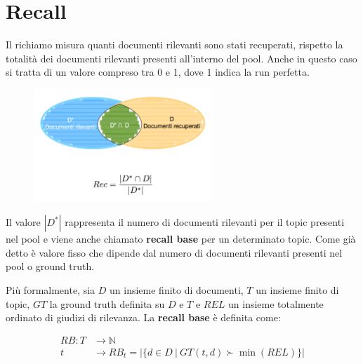 
\FloatBarrier
\section{Recall}

Il richiamo misura quanti documenti rilevanti sono stati recuperati, rispetto la totalità dei documenti rilevanti presenti all'interno del pool. Anche in questo caso si tratta di un valore compreso tra 0 e 1, dove 1 indica la run perfetta.

\begin{figure}[htbp]
	\centering
	\includegraphics[width=0.6\textwidth]{images/l15-fig-1.png}
\end{figure}

Il valore $|D^*|$ rappresenta il numero di documenti rilevanti per il topic presenti nel pool e viene anche chiamato \textbf{recall base} per un determinato topic. Come già detto è valore fisso che dipende dal numero di documenti rilevanti presenti nel pool o ground truth.

Più formalmente, sia $D$ un insieme finito di documenti, $T$ un insieme finito di topic, $GT$ la ground truth definita su $D$ e $T$ e $REL$ un insieme totalmente ordinato di giudizi di rilevanza. La \textbf{recall base} è definita come:

\begin{align*}
	RB : T &\to \mathbb{N} \\
		t &\to RB_t = \Big| \big\{ d \in D \ | \ GT(t,d) \succ \min(REL) \big\} \Big|
\end{align*}

